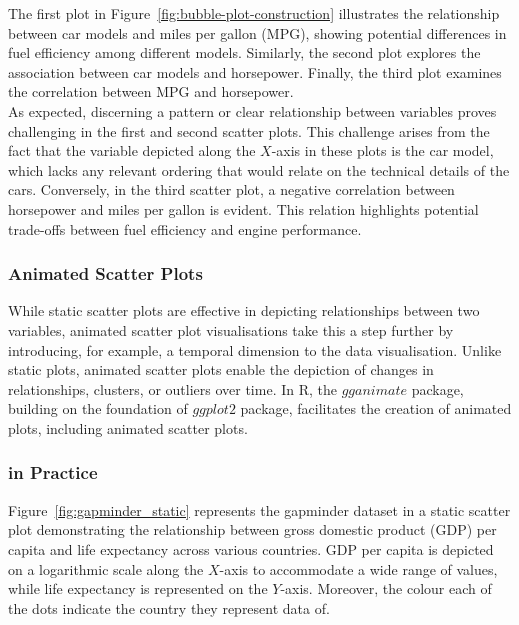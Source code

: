 \documentclass{article}\usepackage[]{graphicx}\usepackage[]{xcolor}
\numberwithin{equation}{section}
\begin{document}
\noindent The first plot in Figure~\ref{fig:bubble-plot-construction} illustrates the relationship between car models and miles per gallon (MPG), showing potential differences in fuel efficiency among different models. Similarly, the second plot explores the association between car models and horsepower. Finally, the third plot examines the correlation between MPG and horsepower. \\

\noindent As expected, discerning a pattern or clear relationship between variables proves challenging in the first and second scatter plots. This challenge arises from the fact that the variable depicted along the $X$-axis in these plots is the car model, which lacks any relevant ordering that would relate on the technical details of the cars. Conversely, in the third scatter plot, a negative correlation between horsepower and miles per gallon is evident. This relation highlights potential trade-offs between fuel efficiency and engine performance. 

\subsubsection{Animated Scatter Plots}
\noindent While static scatter plots are effective in depicting relationships between two variables, animated scatter plot visualisations take this a step further by introducing, for example, a temporal dimension to the data visualisation. Unlike static plots, animated scatter plots enable the depiction of changes in relationships, clusters, or outliers over time. In R, the $gganimate$ package, building on the foundation of $ggplot2$ package, facilitates the creation of animated plots, including animated scatter plots. 

\subsubsection{ in Practice}

\noindent Figure~\ref{fig:gapminder_static} represents the gapminder dataset in a static scatter plot demonstrating the relationship between gross domestic product (GDP) per capita and life expectancy across various countries. GDP per capita is depicted on a logarithmic scale along the $X$-axis to accommodate a wide range of values, while life expectancy is represented on the $Y$-axis. Moreover, the colour each of the dots indicate the country they represent data of.\\
\end{document}
